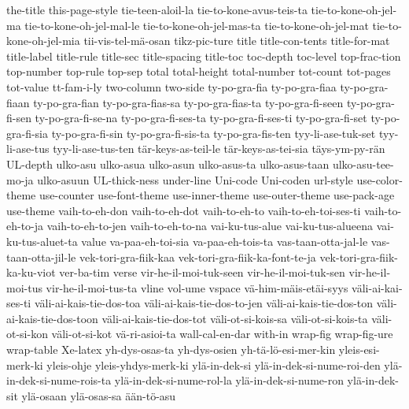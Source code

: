 {the-title
this-page-style
tie-teen-aloil-la
tie-to-kone-avus-teis-ta
tie-to-kone-oh-jel-ma
tie-to-kone-oh-jel-mal-le
tie-to-kone-oh-jel-mas-ta
tie-to-kone-oh-jel-mat
tie-to-kone-oh-jel-mia
tii-vis-tel-mä-osan
tikz-pic-ture
title
title-con-tents
title-for-mat
title-label
title-rule
title-sec
title-spacing
title-toc
toc-depth
toc-level
top-frac-tion
top-number
top-rule
top-sep
total
total-height
total-number
tot-count
tot-pages
tot-value
tt-fam-i-ly
two-column
two-side
ty-po-gra-fia
ty-po-gra-fiaa
ty-po-gra-fiaan
ty-po-gra-fian
ty-po-gra-fias-sa
ty-po-gra-fias-ta
ty-po-gra-fi-seen
ty-po-gra-fi-sen
ty-po-gra-fi-se-na
ty-po-gra-fi-ses-ta
ty-po-gra-fi-ses-ti
ty-po-gra-fi-set
ty-po-gra-fi-sia
ty-po-gra-fi-sin
ty-po-gra-fi-sis-ta
ty-po-gra-fis-ten
tyy-li-ase-tuk-set
tyy-li-ase-tus
tyy-li-ase-tus-ten
tär-keys-as-teil-le
tär-keys-as-tei-sia
täys-ym-py-rän
UL-depth
ulko-asu
ulko-asua
ulko-asun
ulko-asus-ta
ulko-asus-taan
ulko-asu-tee-mo-ja
ulko-asuun
UL-thick-ness
under-line
Uni-code
Uni-coden
url-style
use-color-theme
use-counter
use-font-theme
use-inner-theme
use-outer-theme
use-pack-age
use-theme
vaih-to-eh-don
vaih-to-eh-dot
vaih-to-eh-to
vaih-to-eh-toi-ses-ti
vaih-to-eh-to-ja
vaih-to-eh-to-jen
vaih-to-eh-to-na
vai-ku-tus-alue
vai-ku-tus-alueena
vai-ku-tus-aluet-ta
value
va-paa-eh-toi-sia
va-paa-eh-tois-ta
vas-taan-otta-jal-le
vas-taan-otta-jil-le
vek-tori-gra-fiik-kaa
vek-tori-gra-fiik-ka-font-te-ja
vek-tori-gra-fiik-ka-ku-viot
ver-ba-tim
verse
vir-he-il-moi-tuk-seen
vir-he-il-moi-tuk-sen
vir-he-il-moi-tus
vir-he-il-moi-tus-ta
vline
vol-ume
vspace
vä-him-mäis-etäi-syys
väli-ai-kai-ses-ti
väli-ai-kais-tie-dos-toa
väli-ai-kais-tie-dos-to-jen
väli-ai-kais-tie-dos-ton
väli-ai-kais-tie-dos-toon
väli-ai-kais-tie-dos-tot
väli-ot-si-kois-sa
väli-ot-si-kois-ta
väli-ot-si-kon
väli-ot-si-kot
vä-ri-asioi-ta
wall-cal-en-dar
with-in
wrap-fig
wrap-fig-ure
wrap-table
Xe-latex
yh-dys-osas-ta
yh-dys-osien
yh-tä-lö-esi-mer-kin
yleis-esi-merk-ki
yleis-ohje
yleis-yhdys-merk-ki
ylä-in-dek-si
ylä-in-dek-si-nume-roi-den
ylä-in-dek-si-nume-rois-ta
ylä-in-dek-si-nume-rol-la
ylä-in-dek-si-nume-ron
ylä-in-dek-sit
ylä-osaan
ylä-osas-sa
ään-tö-asu
}
